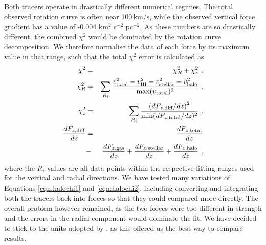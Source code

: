 \documentclass[useAMS,usenatbib]{mn2e}
\newcommand{\hi}{%
  \relax
  \ifmmode
    \textrm{\textsc{HI}}
  \else
    \textsc{H{\smaller}I}
  \fi
}
\begin{document}
Both tracers operate in drastically different numerical regimes. 
The total observed rotation curve is often near 100\,km/s, while the 
observed vertical force gradient has a value of -0.004 km$^2$ s$^{-2}$ pc$^{-2}$.
As these numbers are so drastically different, the combined $\chi^2$ 
would be dominated by the rotation curve decomposition.
We therefore  normalise the data of each force by its maximum value 
in that range, such that the total $\chi^2$ error is calculated as
\begin{eqnarray}
\chi^2 &=& \chi^2_R + \chi^2_z\,\label{eqn:halochi}\, ,\\
\chi^2_R &=& \sum_{R_i} \frac{v_\textrm{total}^2 - v_\hi^2 - v_\textrm{stellar}^2 - v_\textrm{halo}^2}{\max({v_\textrm{total})^2}}\,\,,\label{eqn:halochi1}\\
\chi^2_z &=& \sum_{R_i} \frac{\left(  dF_{z,\textrm{diff}}/dz   \right)^2}{\min(dF_{z,\textrm{total}}/dz)^2}\,\,,\label{eqn:halochi2}\\
\frac{dF_{z,\textrm{diff}}}{dz} &=& \frac{dF_{z,\textrm{total}}}{dz} \nonumber \\
&-& \frac{dF_{z,\textrm{gas}}}{dz}+\frac{dF_{z,\textrm{stellar}}}{dz}+\frac{dF_{z,\textrm{halo}}}{dz}\,\,,
\end{eqnarray}
where the $R_i$ values are all data points within the respective 
fitting ranges used for the vertical and radial directions.
We have tested many variations of Equations \ref{eqn:halochi1} and 
\ref{eqn:halochi2}, including converting and integrating both the 
tracers back into forces so that they could compared more directly. 
The overall problem however remained, as the two forces were too 
different in strength and the errors in the radial component would 
dominate the fit.
We have decided to stick to the units adopted by \citet{OBrien2010D}, 
as this offered us the best way to compare results.
\end{document}
